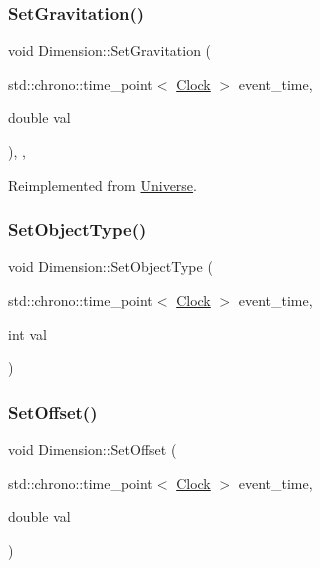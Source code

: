 \subsubsection{\texorpdfstring{Set\+Gravitation()}{SetGravitation()}}
{\footnotesize\ttfamily void Dimension\+::\+Set\+Gravitation (\begin{DoxyParamCaption}\item[{std\+::chrono\+::time\+\_\+point$<$ \mbox{\hyperlink{universe_8h_a0ef8d951d1ca5ab3cfaf7ab4c7a6fd80}{Clock}} $>$}]{event\+\_\+time,  }\item[{double}]{val }\end{DoxyParamCaption})\hspace{0.3cm}{\ttfamily [inline]}, {\ttfamily [final]}, {\ttfamily [virtual]}}



Reimplemented from \mbox{\hyperlink{classUniverse_ae0cb8d86b2fbb8396d605160344b42f5}{Universe}}.

\mbox{\label{classDimension_a484621a7c6f9b43f6e251ba04e0fdf8b}} 
\subsubsection{\texorpdfstring{Set\+Object\+Type()}{SetObjectType()}}
{\footnotesize\ttfamily void Dimension\+::\+Set\+Object\+Type (\begin{DoxyParamCaption}\item[{std\+::chrono\+::time\+\_\+point$<$ \mbox{\hyperlink{universe_8h_a0ef8d951d1ca5ab3cfaf7ab4c7a6fd80}{Clock}} $>$}]{event\+\_\+time,  }\item[{int}]{val }\end{DoxyParamCaption})}

\mbox{\label{classDimension_af74dd7af3af95c0a51b001b6ad665300}} 
\subsubsection{\texorpdfstring{Set\+Offset()}{SetOffset()}}
{\footnotesize\ttfamily void Dimension\+::\+Set\+Offset (\begin{DoxyParamCaption}\item[{std\+::chrono\+::time\+\_\+point$<$ \mbox{\hyperlink{universe_8h_a0ef8d951d1ca5ab3cfaf7ab4c7a6fd80}{Clock}} $>$}]{event\+\_\+time,  }\item[{double}]{val }\end{DoxyParamCaption})}

